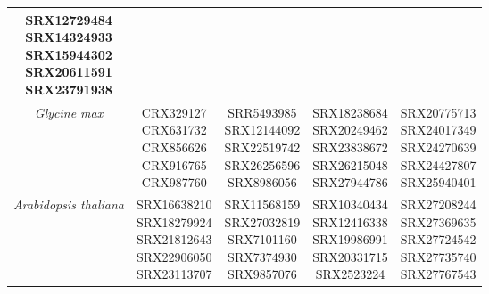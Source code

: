 {{\begin{longtable}{ccccc}
    \makecell[l]{SRX12729484 \\ SRX14324933 \\ SRX15944302 \\ SRX20611591 \\ SRX23791938} \\
    \hline 
    \textit{Glycine max} & 
    \makecell[l]{CRX329127 \\ CRX631732 \\ CRX856626 \\ CRX916765 \\ CRX987760} & 
    \makecell[l]{SRR5493985 \\ SRX12144092 \\ SRX22519742 \\ SRX26256596 \\ SRX8986056} & 
    \makecell[l]{SRX18238684 \\ SRX20249462 \\ SRX23838672 \\ SRX26215048 \\ SRX27944786} & 
    \makecell[l]{SRX20775713 \\ SRX24017349 \\ SRX24270639 \\ SRX24427807 \\ SRX25940401} \\
    \hline 
    \textit{Arabidopsis thaliana} & 
    \makecell[l]{SRX16638210 \\ SRX18279924 \\ SRX21812643 \\ SRX22906050 \\ SRX23113707} & 
    \makecell[l]{SRX11568159 \\ SRX27032819 \\ SRX7101160 \\ SRX7374930 \\ SRX9857076} & 
    \makecell[l]{SRX10340434 \\ SRX12416338 \\ SRX19986991 \\ SRX20331715 \\ SRX2523224} & 
    \makecell[l]{SRX27208244 \\ SRX27369635 \\ SRX27724542 \\ SRX27735740 \\ SRX27767543} \\
    \bottomrule
\end{longtable}
}

\clearpage %

}

